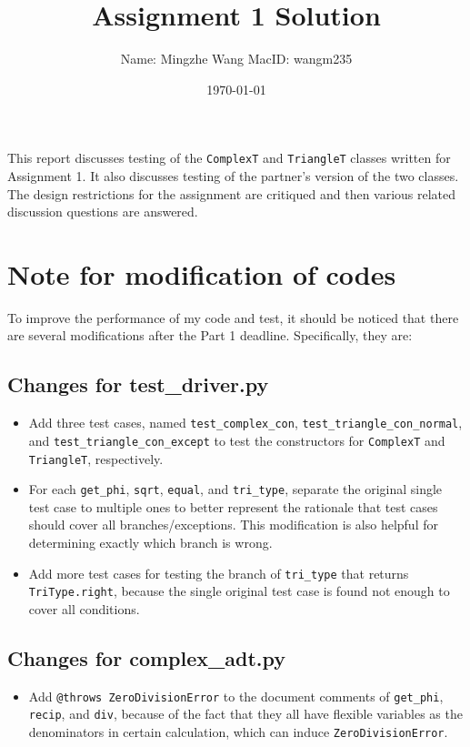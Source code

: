 \documentclass[12pt]{article}
\title{Assignment 1 Solution}
\author{Name: Mingzhe Wang MacID: wangm235}
\date{\today}
\begin{document}
\maketitle

This report discusses testing of the \verb|ComplexT| and \verb|TriangleT|
classes written for Assignment 1. It also discusses testing of the partner's
version of the two classes. The design restrictions for the assignment
are critiqued and then various related discussion questions are answered.

\section*{Note for modification of codes}
To improve the performance of my code and test, it should be noticed that there are several modifications after the Part 1 deadline. Specifically, they are:
\subsection*{Changes for test\_driver.py}
\begin{itemize}
\item Add three test cases, named \verb|test_complex_con|, \verb|test_triangle_con_normal|, and \verb|test_triangle_con_except| to test the constructors for \verb|ComplexT| and \verb|TriangleT|, respectively.
\item For each \verb|get_phi|, \verb|sqrt|, \verb|equal|, and \verb|tri_type|, separate the original single test case to multiple ones to better represent the rationale that test cases should cover all branches/exceptions. This modification is also helpful for determining exactly which branch is wrong.
\item Add more test cases for testing the branch of \verb|tri_type| that returns \verb|TriType.right|, because the single original test case is found not enough to cover all conditions.
\end{itemize}
\subsection*{Changes for complex\_adt.py}
\begin{itemize}
\item Add \verb|@throws ZeroDivisionError| to the document comments of \verb|get_phi|, \verb|recip|, and \verb|div|, because of the fact that they all have flexible variables as the denominators in certain calculation, which can induce \verb|ZeroDivisionError|.
\end{itemize}
\end{document}
